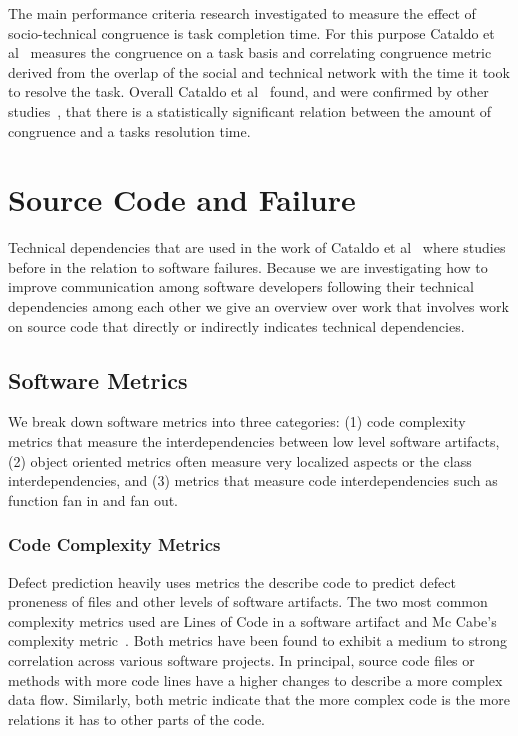 The main performance criteria research investigated to measure the effect of socio-technical congruence is task completion time.
For this purpose Cataldo et al~\cite{cataldo:cscw:2006} measures the congruence on a task basis and correlating congruence metric derived from the overlap of the social and technical network with the time it took to resolve the task.
Overall Cataldo et al~\cite{cataldo:cscw:2006} found, and were confirmed by other studies~\cite{valetto:msr:2007,ehrlich:stc:2008}, that there is a statistically significant relation between the amount of congruence and a tasks resolution time.



\section{Source Code and Failure}
Technical dependencies that are used in the work of Cataldo et al~\cite{cataldo:cscw:2006} where studies before in the relation to software failures.
Because we are investigating how to improve communication among software developers following their technical dependencies among each other we give an overview over work that involves work on source code that directly or indirectly indicates technical dependencies. 

\subsection{Software Metrics}
\label{chap:6:measure}
We break down software metrics into three categories:
(1) code complexity metrics that measure the interdependencies between low level software artifacts,
(2) object oriented metrics often measure very localized aspects or the class interdependencies,
and (3) metrics that measure code interdependencies such as function fan in and fan out.

\subsubsection{Code Complexity Metrics}
Defect prediction heavily uses metrics the describe code to predict defect proneness of files and other levels of software artifacts.
%
The two most common complexity metrics used are Lines of Code in a software artifact and Mc Cabe's complexity metric~\cite{mccabe:ieee:1976}.
Both metrics have been found to exhibit a medium to strong correlation across various software projects.
In principal, source code files or methods with more code lines have a higher changes to describe a more complex data flow.
Similarly, both metric indicate that the more complex code is the more relations it has to other parts of the code.

